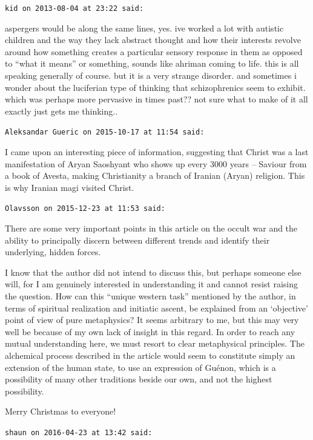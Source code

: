 \begin{footnotesize}
\begin{sffamily}
\hfill

\texttt{kid on 2013-08-04 at 23:22 said:}

aspergers would be along the same lines, yes. ive worked a lot with autistic children and the way they lack abstract thought and how their interests revolve around how something creates a particular sensory response in them as opposed to ``what it means'' or something, sounds like ahriman coming to life. this is all speaking generally of course. but it is a very strange disorder. and sometimes i wonder about the luciferian type of thinking that schizophrenics seem to exhibit. which was perhaps more pervasive in times past?? not sure what to make of it all exactly just gets me thinking..

\hfill

\texttt{Aleksandar Gueric on 2015-10-17 at 11:54 said:}

I came upon an interesting piece of information, suggesting that Christ was a last manifestation of Aryan Saoshyant who shows up every 3000 years -- Saviour from a book of Avesta, making Christianity a branch of Iranian (Aryan) religion. This is why Iranian magi visited Christ.

\hfill

\texttt{Olavsson on 2015-12-23 at 11:53 said:}

There are some very important points in this article on the occult war and the ability to principally discern between different trends and identify their underlying, hidden forces.

I know that the author did not intend to discuss this, but perhaps someone else will, for I am genuinely interested in understanding it and cannot resist raising the question. How can this ``unique western task'' mentioned by the author, in terms of spiritual realization and initiatic ascent, be explained from an `objective' point of view of pure metaphysics? It seems arbitrary to me, but this may very well be because of my own lack of insight in this regard. In order to reach any mutual understanding here, we must resort to clear metaphysical principles. The alchemical process described in the article would seem to constitute simply an extension of the human state, to use an expression of Guénon, which is a possibility of many other traditions beside our own, and not the highest possibility.

Merry Christmas to everyone!

\hfill

\texttt{shaun on 2016-04-23 at 13:42 said:}


\end{sffamily}
\end{footnotesize}
